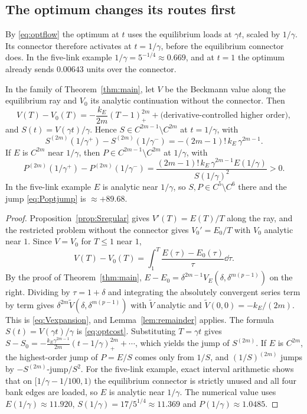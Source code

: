 \subsection{The optimum changes its routes first}\label{sec:optimumside}

By \eqref{eq:optflow} the optimum at $t$ uses the equilibrium loads at $\gamma t$, scaled by $1/\gamma$. Its connector therefore activates at $t=1/\gamma$, before the equilibrium connector does. In the five-link example $1/\gamma=5^{-1/4}\approx0.669$, and at $t=1$ the optimum already sends $0.00643$ units over the connector.

\begin{theorem}\label{thm:optimumtransition}
In the family of Theorem~\ref{thm:main}, let $V$ be the Beckmann value along the equilibrium ray and $V_0$ its analytic continuation without the connector. Then
\begin{equation}\label{eq:Vexpansion}
 V(T)-V_0(T)=-\frac{k_E}{2m}(T-1)_+^{2m}+\text{(derivative-controlled higher order)},
\end{equation}
and $S(t)=V(\gamma t)/\gamma$. Hence $S\in C^{2m-1}\setminus C^{2m}$ at $t=1/\gamma$, with
\[
 S^{(2m)}(1/\gamma^+)-S^{(2m)}(1/\gamma^-)=-(2m-1)!\,k_E\,\gamma^{2m-1}.
\]
If $E$ is $C^{2m}$ near $1/\gamma$, then $P\in C^{2m-1}\setminus C^{2m}$ at $1/\gamma$, with
\begin{equation}\label{eq:Poptjump}
 P^{(2m)}(1/\gamma^+)-P^{(2m)}(1/\gamma^-)=\frac{(2m-1)!\,k_E\,\gamma^{2m-1}E(1/\gamma)}{S(1/\gamma)^2}>0.
\end{equation}
In the five-link example $E$ is analytic near $1/\gamma$, so $S,P\in C^5\setminus C^6$ there and the jump \eqref{eq:Poptjump} is $\approx+89.68$.
\end{theorem}
\begin{proof}
Proposition~\ref{prop:Sregular} gives $V'(T)=E(T)/T$ along the ray, and the restricted problem without the connector gives $V_0'=E_0/T$ with $V_0$ analytic near $1$. Since $V=V_0$ for $T\le1$ near $1$,
\[
 V(T)-V_0(T)=\int_1^T\frac{E(\tau)-E_0(\tau)}{\tau}\dd\tau .
\]
By the proof of Theorem~\ref{thm:main}, $E-E_0=\delta^{2m-1}V_E(\delta,\delta^{m(p-1)})$ on the right. Dividing by $\tau=1+\delta$ and integrating the absolutely convergent series term by term gives $\delta^{2m}\widetilde V(\delta,\delta^{m(p-1)})$ with $\widetilde V$ analytic and $\widetilde V(0,0)=-k_E/(2m)$. This is \eqref{eq:Vexpansion}, and Lemma~\ref{lem:remainder} applies. The formula $S(t)=V(\gamma t)/\gamma$ is \eqref{eq:optcost}. Substituting $T=\gamma t$ gives $S-S_0=-\frac{k_E\gamma^{2m-1}}{2m}(t-1/\gamma)_+^{2m}+\cdots$, which yields the jump of $S^{(2m)}$. If $E$ is $C^{2m}$, the highest-order jump of $P=E/S$ comes only from $1/S$, and $(1/S)^{(2m)}$ jumps by $-S^{(2m)}\text{-jump}/S^2$. For the five-link example, exact interval arithmetic shows that on $[1/\gamma-1/100,1)$ the equilibrium connector is strictly unused and all four bank edges are loaded, so $E$ is analytic near $1/\gamma$. The numerical value uses $E(1/\gamma)\approx11.920$, $S(1/\gamma)=17/5^{1/4}\approx11.369$ and $P(1/\gamma)\approx1.0485$. 
\end{proof}

